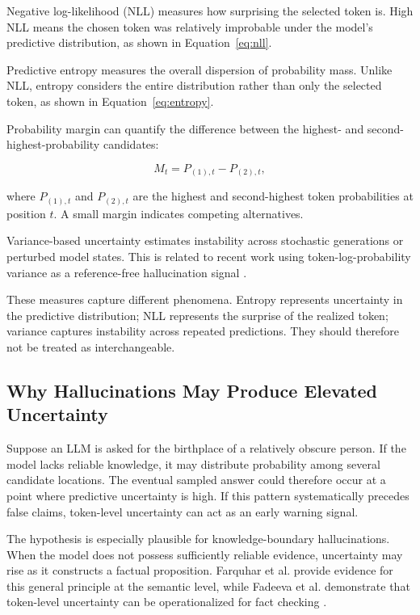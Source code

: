 \documentclass[11pt]{article}
\begin{document}
Negative log-likelihood (NLL) measures how surprising the selected token is. High NLL means the chosen token was relatively improbable under the model's predictive distribution, as shown in Equation~\ref{eq:nll}.

Predictive entropy measures the overall dispersion of probability mass. Unlike NLL, entropy considers the entire distribution rather than only the selected token, as shown in Equation~\ref{eq:entropy}.

Probability margin can quantify the difference between the highest- and second-highest-probability candidates:

\begin{equation}
M_t
=
P_{(1),t}-P_{(2),t},
\label{eq:margin}
\end{equation}

where $P_{(1),t}$ and $P_{(2),t}$ are the highest and second-highest token probabilities at position $t$. A small margin indicates competing alternatives.

Variance-based uncertainty estimates instability across stochastic generations or perturbed model states. This is related to recent work using token-log-probability variance as a reference-free hallucination signal \cite{kumar2025}.

These measures capture different phenomena. Entropy represents uncertainty in the predictive distribution; NLL represents the surprise of the realized token; variance captures instability across repeated predictions. They should therefore not be treated as interchangeable.

\subsection{Why Hallucinations May Produce Elevated Uncertainty}
\label{sec:elevated-uncertainty}

Suppose an LLM is asked for the birthplace of a relatively obscure person. If the model lacks reliable knowledge, it may distribute probability among several candidate locations. The eventual sampled answer could therefore occur at a point where predictive uncertainty is high. If this pattern systematically precedes false claims, token-level uncertainty can act as an early warning signal.

The hypothesis is especially plausible for knowledge-boundary hallucinations. When the model does not possess sufficiently reliable evidence, uncertainty may rise as it constructs a factual proposition. Farquhar et al. provide evidence for this general principle at the semantic level, while Fadeeva et al. demonstrate that token-level uncertainty can be operationalized for fact checking \cite{farquhar2024,fadeeva2024}.
\end{document}
